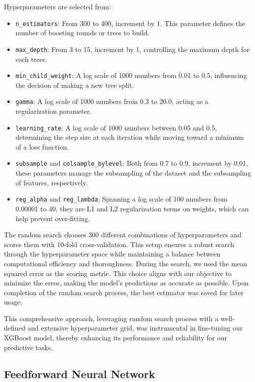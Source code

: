\documentclass{article}
\begin{document}
Hyperparameters are selected from:

\begin{itemize}
    \item \texttt{n\_estimators}: From 300 to 400, increment by 1. This parameter defines the number of boosting rounds or trees to build.
    \item \texttt{max\_depth}: From 3 to 15, increment by 1, controlling the maximum depth for each trees.
    \item \texttt{min\_child\_weight}: A log scale of 1000 numbers from 0.01 to 0.5, influencing the decision of making a new tree split.
    \item \texttt{gamma}: A log scale of 1000 numbers from 0.3 to 20.0, acting as a regularization parameter.
    \item \texttt{learning\_rate}: A log scale of 1000 numbers between 0.05 and 0.5, determining the step size at each iteration while moving toward a minimum of a loss function.
    \item \texttt{subsample} and \texttt{colsample\_bylevel}: Both from 0.7 to 0.9, increment by 0.01, these parameters manage the subsampling of the dataset and the subsampling of features, respectively.
    \item \texttt{reg\_alpha} and \texttt{reg\_lambda}: Spanning a log scale of 100 numbers from 0.00001 to 40, they are L1 and L2 regularization terms on weights, which can help prevent over-fitting.
\end{itemize}

The random search chooses 300 different combinations of hyperparameters and scores them with 10-fold cross-validation. This setup ensures a robust search through the hyperparameter space while maintaining a balance between computational efficiency and thoroughness. During the search, we used the mean squared error as the scoring metric. This choice aligns with our objective to minimize the error, making the model's predictions as accurate as possible. Upon completion of the random search process, the best estimator was saved for later usage.

This comprehensive approach, leveraging random search process with a well-defined and extensive hyperparameter grid, was instrumental in fine-tuning our XGBoost model, thereby enhancing its performance and reliability for our predictive tasks.

\subsection{Feedforward Neural Network}
\end{document}
